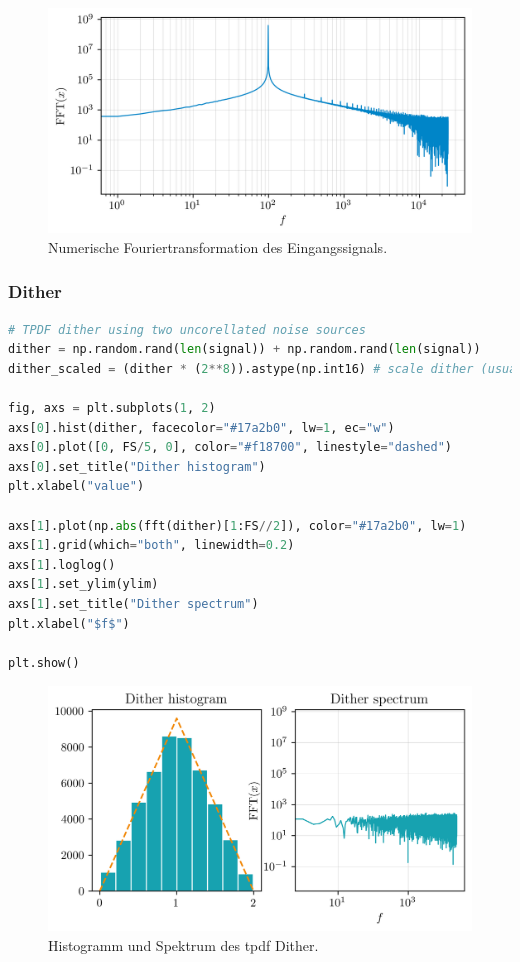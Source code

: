 \begin{figure}
  \centering
  \includegraphics{./img/83e40ac8704f77e2f58a6800bc3e6c99c2c385d0.png}
  \caption[Numerische Fouriertransformation des Eingangssignals]{Numerische Fouriertransformation des Eingangssignals.}
\end{figure}

\hypertarget{dither}{%
\subsubsection{Dither}\label{dither}}

\begin{lstlisting}[language=Python]
# TPDF dither using two uncorellated noise sources
dither = np.random.rand(len(signal)) + np.random.rand(len(signal))
dither_scaled = (dither * (2**8)).astype(np.int16) # scale dither (usually only to 1 LSB)

fig, axs = plt.subplots(1, 2)
axs[0].hist(dither, facecolor="#17a2b0", lw=1, ec="w")
axs[0].plot([0, FS/5, 0], color="#f18700", linestyle="dashed")
axs[0].set_title("Dither histogram")
plt.xlabel("value")

axs[1].plot(np.abs(fft(dither)[1:FS//2]), color="#17a2b0", lw=1)
axs[1].grid(which="both", linewidth=0.2)
axs[1].loglog()
axs[1].set_ylim(ylim)
axs[1].set_title("Dither spectrum")
plt.xlabel("$f$")

plt.show()
\end{lstlisting}

\begin{figure}
  \centering
  \includegraphics{./img/5471d313422eed63396a88ef6e668194d821502f.png}
  \caption[Histogramm und Spektrum des \acrshort{tpdf} Dither]{Histogramm und Spektrum des \acrshort{tpdf} Dither.}
\end{figure}

